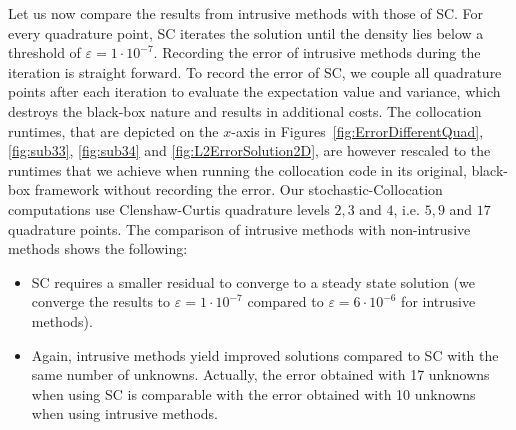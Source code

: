 Let us now compare the results from intrusive methods with those of SC. For every quadrature point, SC iterates the solution until the density lies below a threshold of $\varepsilon = 1\cdot 10^{-7}$. Recording the error of intrusive methods during the iteration is straight forward. To record the error of SC, we couple all quadrature points after each iteration to evaluate the expectation value and variance, which destroys the black-box nature and results in additional costs. The collocation runtimes, that are depicted on the $x$-axis in Figures~\ref{fig:ErrorDifferentQuad}, \ref{fig:sub33}, \ref{fig:sub34} and \ref{fig:L2ErrorSolution2D}, are however rescaled to the runtimes that we achieve when running the collocation code in its original, black-box framework without recording the error. Our stochastic-Collocation computations use Clenshaw-Curtis quadrature levels $2,3$ and $4$, i.e. $5,9$ and $17$ quadrature points. The comparison of intrusive methods with non-intrusive methods shows the following:
\begin{itemize}
\item SC requires a smaller residual to converge to a steady state solution (we converge the results to $\varepsilon = 1\cdot 10^{-7}$ compared to $\varepsilon = 6\cdot 10^{-6}$ for intrusive methods).
\item Again, intrusive methods yield improved solutions compared to SC with the same number of unknowns. Actually, the error obtained with 17 unknowns when using SC is comparable with the error obtained with 10 unknowns when using intrusive methods.
\end{itemize}

